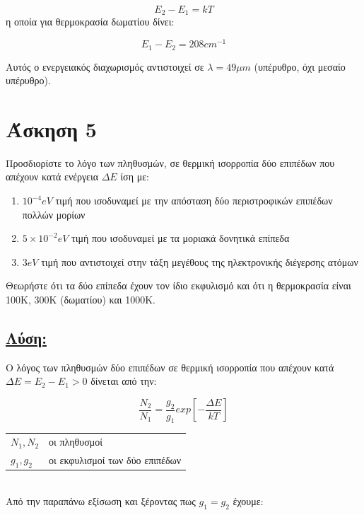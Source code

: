 \documentclass[a4paper,11pt,titlepage]{article}
\numberwithin{equation}{section} %
\begin{document}
\begin{equation}
 E_2-E_1=kT
\end{equation}
η οποία για θερμοκρασία δωματίου δίνει:

\begin{equation}
 E_1-E_2=208cm^{-1}
\end{equation}

Αυτός ο ενεργειακός διαχωρισμός αντιστοιχεί σε $\lambda=49{\mu}m$ (υπέρυθρο, όχι μεσαίο υπέρυθρο).
\newpage
\section{Άσκηση 5}

Προσδιορίστε το λόγο των πληθυσμών, σε θερμική ισορροπία δύο επιπέδων που απέχουν κατά ενέργεια ${\Delta}E$ ίση με:
\begin{enumerate}
 \item$10^{-4}eV$ τιμή που ισοδυναμεί με την απόσταση δύο περιστροφικών επιπέδων πολλών μορίων 
 \item$5\times10^{-2}eV$ τιμή που ισοδυναμεί με τα μοριακά δονητικά επίπεδα
 \item$3eV$ τιμή που αντιστοιχεί στην τάξη μεγέθους της ηλεκτρονικής διέγερσης ατόμων
\end{enumerate}
Θεωρήστε ότι τα δύο επίπεδα έχουν τον ίδιο εκφυλισμό και ότι η θερμοκρασία είναι 100Κ, 300Κ (δωματίου) και 1000Κ.
\subsection*{\underline{Λύση:}}
Ο λόγος των πληθυσμών δύο επιπέδων σε θερμική ισορροπία που απέχουν κατά \\${\Delta}E=E_2-E_1>0$ δίνεται από την:

\begin{equation}
\dfrac{N_2}{N_1}=\dfrac{g_2}{g_1}exp[-\dfrac{{\Delta}E}{kT}]
\end{equation}

\begin{tabular}{l | l}
\hline
 $N_1,N_2$ & οι πληθυσμοί\\
 $g_1,g_2$ & οι εκφυλισμοί των δύο επιπέδων\\
\hline
\end{tabular}
\\[0.5cm]
Από την παραπάνω εξίσωση και ξέροντας πως $g_1=g_2$ έχουμε:
\end{document}
